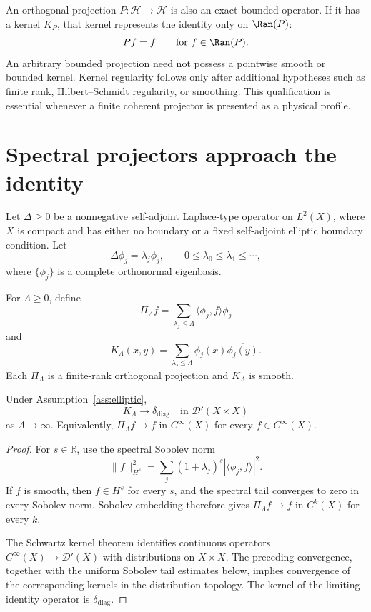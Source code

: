 \documentclass[11pt]{article}
\newcommand{\Dcal}{\mathcal D}
\newcommand{\Hh}{\mathcal H}
\begin{document}
An orthogonal projection \(P:\Hh\to\Hh\) is also an exact bounded operator.
If it has a kernel \(K_P\), that kernel represents the identity only on
\(\Ran(P)\):
\[
Pf=f\qquad\text{for }f\in\Ran(P).
\]
An arbitrary bounded projection need not possess a pointwise smooth or bounded
kernel. Kernel regularity follows only after additional hypotheses such as
finite rank, Hilbert--Schmidt regularity, or smoothing. This qualification is
essential whenever a finite coherent projector is presented as a physical
profile.

\section{Spectral projectors approach the identity}

\begin{assumption}\label{ass:elliptic}
Let \(\Delta\geq0\) be a nonnegative self-adjoint Laplace-type operator on
\(L^2(X)\), where \(X\) is compact and has either no boundary or a fixed
self-adjoint elliptic boundary condition. Let
\[
\Delta\phi_j=\lambda_j\phi_j,
\qquad
0\leq\lambda_0\leq\lambda_1\leq\cdots,
\]
where \(\{\phi_j\}\) is a complete orthonormal eigenbasis.
\end{assumption}

For \(\Lambda\geq0\), define
\[
\Pi_\Lambda f
=\sum_{\lambda_j\leq\Lambda}
\langle\phi_j,f\rangle\phi_j
\]
and
\[
K_\Lambda(x,y)
=\sum_{\lambda_j\leq\Lambda}
\phi_j(x)\overline{\phi_j(y)}.
\]
Each \(\Pi_\Lambda\) is a finite-rank orthogonal projection and
\(K_\Lambda\) is smooth.

\begin{theorem}
\label{thm:spectral-kernel}
Under Assumption~\ref{ass:elliptic},
\[
K_\Lambda\longrightarrow\delta_{\mathrm{diag}}
\quad\text{in }\Dcal'(X\times X)
\]
as \(\Lambda\to\infty\). Equivalently,
\(\Pi_\Lambda f\to f\) in \(C^\infty(X)\) for every
\(f\in C^\infty(X)\).
\end{theorem}

\begin{proof}
For \(s\in\mathbb R\), use the spectral Sobolev norm
\[
\|f\|_{H^s}^2
=\sum_j(1+\lambda_j)^s
|\langle\phi_j,f\rangle|^2.
\]
If \(f\) is smooth, then \(f\in H^s\) for every \(s\), and the spectral tail
converges to zero in every Sobolev norm. Sobolev embedding therefore gives
\(\Pi_\Lambda f\to f\) in \(C^k(X)\) for every \(k\).

The Schwartz kernel theorem identifies continuous operators
\(C^\infty(X)\to\Dcal'(X)\) with distributions on \(X\times X\). The preceding
convergence, together with the uniform Sobolev tail estimates below, implies
convergence of the corresponding kernels in the distribution topology. The
kernel of the limiting identity operator is
\(\delta_{\mathrm{diag}}\).
\end{proof}
\end{document}
